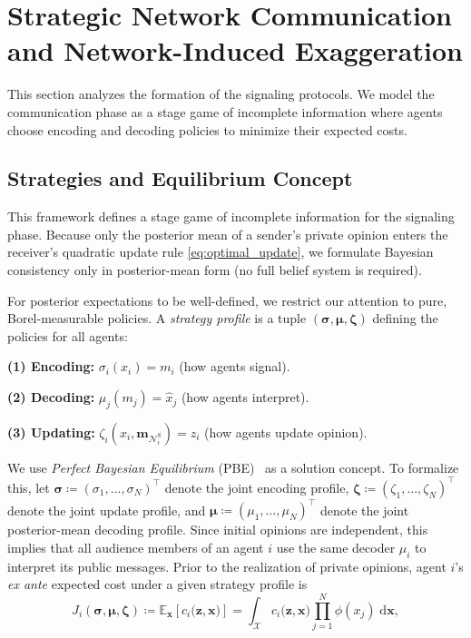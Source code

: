 \documentclass[journal,twoside,web]{ieeecolor}
\begin{document}
\section{Strategic Network Communication and Network-Induced Exaggeration}
\label{sec:exaggeration}

This section analyzes the formation of the signaling protocols. We model the communication phase as a stage game of incomplete information where agents choose encoding and decoding policies to minimize their expected costs.

\subsection{Strategies and Equilibrium Concept}
\label{subsec:equilibrium}
This framework defines a stage game of incomplete information for the signaling phase. Because only the posterior mean of a sender's private opinion enters the receiver's quadratic update rule \eqref{eq:optimal_update}, we formulate Bayesian consistency only in posterior-mean form (no full belief system is required).

For posterior expectations to be well-defined, we restrict our attention to pure, Borel-measurable policies. A \emph{strategy profile} is a tuple $(\boldsymbol{\sigma}, \boldsymbol{\mu}, \boldsymbol{\zeta})$ defining the policies for all agents:

\noindent\textbf{(1) Encoding:} $\sigma_i(x_i) = m_i$ (how agents signal).

\noindent\textbf{(2) Decoding:} $\mu_j(m_j) = \widehat{x}_j$ (how agents interpret).

\noindent\textbf{(3) Updating:} $\zeta_i(x_i, \mathbf{m}_{\mathcal{N}_i^{\mathrm{S}}}) = z_i$ (how agents update opinion).

We use \emph{Perfect Bayesian Equilibrium} (PBE)~\cite{fudenberg1991perfect} as a solution concept. To formalize this, let $\bm{\sigma} \coloneqq (\sigma_1, \dots, \sigma_N)^\top$ denote the joint encoding profile, $\bm{\zeta} \coloneqq (\zeta_1, \dots, \zeta_N)^\top$ denote the joint update profile, and $\bm{\mu} \coloneqq (\mu_1, \dots, \mu_N)^\top$ denote the joint posterior-mean decoding profile. Since initial opinions are independent, this implies that all audience members of an agent $i$ use the same decoder $\mu_i$ to interpret its public messages.
Prior to the realization of private opinions, agent $i$'s \emph{ex ante} expected cost under a given strategy profile is
$$J_i(\bm{\sigma}, \bm{\mu}, \bm{\zeta}) \coloneqq \mathbb{E}_{\bm{x}}\!\left[c_i\bigl(\bm{z},\bm{x}\bigr)\right]
    =\!\!\int_{\mathcal{X}}c_i\bigl(\bm{z}, \bm{x}\bigr) \prod_{j=1}^N \phi(x_j)\;\mathrm{d}\bm{x},$$
\end{document}
